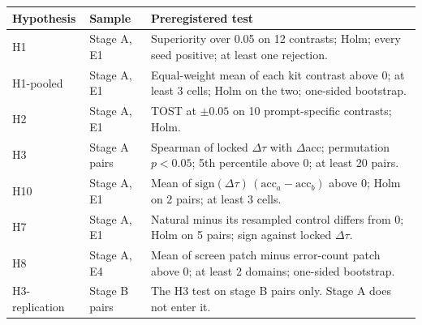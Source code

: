 \begin{tabular}{p{}p{}p{}}
\toprule
Hypothesis & Sample & Preregistered test \\
\midrule
H1 & Stage A, E1 & Superiority over 0.05 on 12 contrasts; Holm; every seed positive; at least one rejection. \\
H1-pooled & Stage A, E1 & Equal-weight mean of each kit contrast above 0; at least 3 cells; Holm on the two; one-sided bootstrap. \\
H2 & Stage A, E1 & TOST at $\pm 0.05$ on 10 prompt-specific contrasts; Holm. \\
H3 & Stage A pairs & Spearman of locked $\Delta\tau$ with $\Delta$acc; permutation $p < 0.05$; 5th percentile above 0; at least 20 pairs. \\
H10 & Stage A, E1 & Mean of $\mathrm{sign}(\Delta\tau)\,(\mathrm{acc}_a - \mathrm{acc}_b)$ above 0; Holm on 2 pairs; at least 3 cells. \\
H7 & Stage A, E1 & Natural minus its resampled control differs from 0; Holm on 5 pairs; sign against locked $\Delta\tau$. \\
H8 & Stage A, E4 & Mean of screen patch minus error-count patch above 0; at least 2 domains; one-sided bootstrap. \\
H3-replication & Stage B pairs & The H3 test on stage B pairs only. Stage A does not enter it. \\
\bottomrule
\end{tabular}
